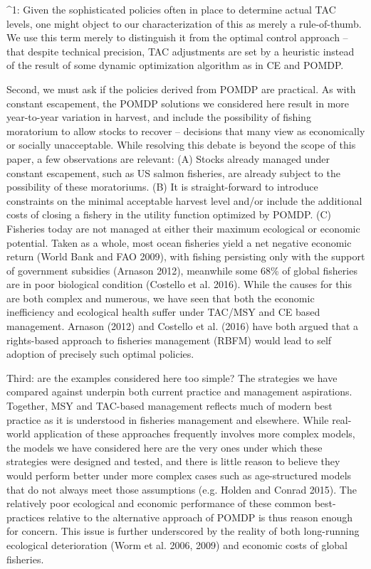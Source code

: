 \documentclass[3p]{elsarticle} %
\begin{document}
\^{}1: Given the sophisticated policies often in place to determine
actual TAC levels, one might object to our characterization of this as
merely a rule-of-thumb. We use this term merely to distinguish it from
the optimal control approach -- that despite technical precision, TAC
adjustments are set by a heuristic instead of the result of some dynamic
optimization algorithm as in CE and POMDP.

Second, we must ask if the policies derived from POMDP are practical. As
with constant escapement, the POMDP solutions we considered here result
in more year-to-year variation in harvest, and include the possibility
of fishing moratorium to allow stocks to recover -- decisions that many
view as economically or socially unacceptable. While resolving this
debate is beyond the scope of this paper, a few observations are
relevant: (A) Stocks already managed under constant escapement, such as
US salmon fisheries, are already subject to the possibility of these
moratoriums. (B) It is straight-forward to introduce constraints on the
minimal acceptable harvest level and/or include the additional costs of
closing a fishery in the utility function optimized by POMDP. (C)
Fisheries today are not managed at either their maximum ecological or
economic potential. Taken as a whole, most ocean fisheries yield a net
negative economic return (World Bank and FAO 2009), with fishing
persisting only with the support of government subsidies (Arnason 2012),
meanwhile some 68\% of global fisheries are in poor biological condition
(Costello et al. 2016). While the causes for this are both complex and
numerous, we have seen that both the economic inefficiency and
ecological health suffer under TAC/MSY and CE based management. Arnason
(2012) and Costello et al. (2016) have both argued that a rights-based
approach to fisheries management (RBFM) would lead to self adoption of
precisely such optimal policies.

Third: are the examples considered here too simple? The strategies we
have compared against underpin both current practice and management
aspirations. Together, MSY and TAC-based management reflects much of
modern best practice as it is understood in fisheries management and
elsewhere. While real-world application of these approaches frequently
involves more complex models, the models we have considered here are the
very ones under which these strategies were designed and tested, and
there is little reason to believe they would perform better under more
complex cases such as age-structured models that do not always meet
those assumptions (e.g. Holden and Conrad 2015). The relatively poor
ecological and economic performance of these common best-practices
relative to the alternative approach of POMDP is thus reason enough for
concern. This issue is further underscored by the reality of both
long-running ecological deterioration (Worm et al. 2006, 2009) and
economic costs of global fisheries.
\end{document}

